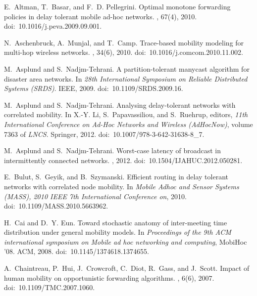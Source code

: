 \documentclass{article}
\begin{document}
\begin{thebibliography}{10}
\scriptsize

E.~Altman, T.~Basar, and F.~D. Pellegrini.
\newblock Optimal monotone forwarding policies in delay tolerant mobile ad-hoc
  networks.
, 67(4), 2010.
\newblock doi:~10.1016/j.peva.2009.09.001.

N.~Aschenbruck, A.~Munjal, and T.~Camp.
\newblock Trace-based mobility modeling for multi-hop wireless networks.
, 34(6), 2010.
\newblock doi:~10.1016/j.comcom.2010.11.002.

M.~Asplund and S.~Nadjm-Tehrani.
\newblock A partition-tolerant manycast algorithm for disaster area networks.
\newblock In {\em 28th International Symposium on Reliable Distributed Systems
  (SRDS)}. IEEE, 2009.
\newblock doi:~10.1109/SRDS.2009.16.

M.~Asplund and S.~Nadjm-Tehrani.
\newblock Analysing delay-tolerant networks with correlated mobility.
\newblock In X.-Y. Li, S.~Papavassiliou, and S.~Ruehrup, editors, {\em 11th
  International Conference on Ad-Hoc Networks and Wireless (AdHocNow)}, volume
  7363 of {\em LNCS}. Springer, 2012.
\newblock doi:~10.1007/978-3-642-31638-8\_7.

M.~Asplund and S.~Nadjm-Tehrani.
\newblock Worst-case latency of broadcast in intermittently connected networks.
, 2012.
\newblock doi:~10.1504/IJAHUC.2012.050281.

E.~Bulut, S.~Geyik, and B.~Szymanski.
\newblock Efficient routing in delay tolerant networks with correlated node
  mobility.
\newblock In {\em Mobile Adhoc and Sensor Systems (MASS), 2010 IEEE 7th
  International Conference on}, 2010.
\newblock doi:~10.1109/MASS.2010.5663962.

H.~Cai and D.~Y. Eun.
\newblock Toward stochastic anatomy of inter-meeting time distribution under
  general mobility models.
\newblock In {\em Proceedings of the 9th ACM international symposium on Mobile
  ad hoc networking and computing}, MobiHoc '08. ACM, 2008.
\newblock doi:~10.1145/1374618.1374655.

A.~Chaintreau, P.~Hui, J.~Crowcroft, C.~Diot, R.~Gass, and J.~Scott.
\newblock Impact of human mobility on opportunistic forwarding algorithms.
, 6(6), 2007.
\newblock doi:~10.1109/TMC.2007.1060.


\end{thebibliography}
\end{document}
